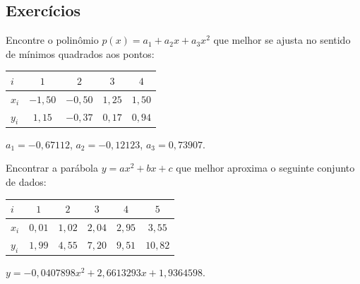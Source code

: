 % 
% 

\subsection*{Exercícios}

\begin{exer}
  Encontre o polinômio $p(x) = a_1 + a_2x + a_3x^2$ que melhor se ajusta no sentido de mínimos quadrados aos pontos:
  \begin{center}
    \begin{tabular}{l|cccc}
      $i$ & $1$ & $2$ & $3$ & $4$ \\\hline
      $x_i$ & $-1,50$ & $-0,50$ & $1,25$ & $1,50$\\
      $y_i$ & $1,15$ & $-0,37$ & $0,17$ & $0,94$
  \end{tabular} 
    \end{center}
\end{exer}
\begin{resp}
    $a_1 = -0,67112$, $a_2 = -0,12123$, $a_3 = 0,73907$. 
\end{resp}

\begin{exer}Encontrar a parábola $y=ax^2+bx+c$ que melhor aproxima o seguinte conjunto de dados:
  \begin{center}
    \begin{tabular}{l|ccccc}
      $i$ & $1$ & $2$ & $3$ & $4$ & $5$ \\\hline
      $x_i$ & $0,01$ & $1,02$ & $2,04$ & $2,95$ & $3,55$\\
      $y_i$ & $1,99$ & $4,55$ & $7,20$ & $9,51$ & $10,82$
    \end{tabular}
  \end{center} 
\end{exer}
\begin{resp}  
    $y=-0,0407898x^2+ 2,6613293x+ 1,9364598$.
\end{resp}

